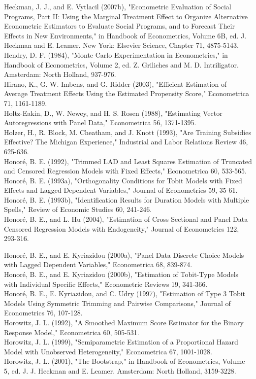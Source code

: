 \documentclass[10pt]{article}
\begin{document}
Heckman, J. J., and E. Vytlacil (2007b), "Econometric Evaluation of Social Programs, Part II: Using the Marginal Treatment Effect to Organize Alternative Econometric Estimators to Evaluate Social Programs, and to Forecast Their Effects in New Environments," in Handbook of Econometrics, Volume 6B, ed. J. Heckman and E. Leamer. New York: Elsevier Science, Chapter 71, 4875-5143.\\
Hendry, D. F. (1984), "Monte Carlo Experimentation in Econometrics," in Handbook of Econometrics, Volume 2, ed. Z. Griliches and M. D. Intriligator. Amsterdam: North Holland, 937-976.\\
Hirano, K., G. W. Imbens, and G. Ridder (2003), "Efficient Estimation of Average Treatment Effects Using the Estimated Propensity Score," Econometrica 71, 1161-1189.\\
Holtz-Eakin, D., W. Newey, and H. S. Rosen (1988), "Estimating Vector Autoregressions with Panel Data," Econometrica 56, 1371-1395.\\
Holzer, H., R. Block, M. Cheatham, and J. Knott (1993), "Are Training Subsidies Effective? The Michigan Experience," Industrial and Labor Relations Review 46, 625-636.\\
Honoré, B. E. (1992), "Trimmed LAD and Least Squares Estimation of Truncated and Censored Regression Models with Fixed Effects," Econometrica 60, 533-565.\\
Honoré, B. E. (1993a), "Orthogonality Conditions for Tobit Models with Fixed Effects and Lagged Dependent Variables," Journal of Econometrics 59, 35-61.\\
Honoré, B. E. (1993b), "Identification Results for Duration Models with Multiple Spells," Review of Economic Studies 60, 241-246.\\
Honoré, B. E., and L. Hu (2004), "Estimation of Cross Sectional and Panel Data Censored Regression Models with Endogeneity," Journal of Econometrics 122, 293-316.

Honoré, B. E., and E. Kyriazidou (2000a), "Panel Data Discrete Choice Models with Lagged Dependent Variables," Econometrica 68, 839-874.\\
Honoré, B. E., and E. Kyriazidou (2000b), "Estimation of Tobit-Type Models with Individual Specific Effects," Econometric Reviews 19, 341-366.\\
Honoré, B. E., E. Kyriazidou, and C. Udry (1997), "Estimation of Type 3 Tobit Models Using Symmetric Trimming and Pairwise Comparisons," Journal of Econometrics 76, 107-128.\\
Horowitz, J. L. (1992), "A Smoothed Maximum Score Estimator for the Binary Response Model," Econometrica 60, 505-531.\\
Horowitz, J. L. (1999), "Semiparametric Estimation of a Proportional Hazard Model with Unobserved Heterogeneity," Econometrica 67, 1001-1028.\\
Horowitz, J. L. (2001), "The Bootstrap," in Handbook of Econometrics, Volume 5, ed. J. J. Heckman and E. Leamer. Amsterdam: North Holland, 3159-3228.
\end{document}
